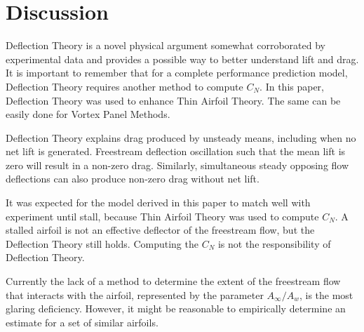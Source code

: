 \section{Discussion}

Deflection Theory is a novel physical argument somewhat corroborated by experimental data and provides a possible way to better understand lift and drag.
It is important to remember that for a complete performance prediction model, Deflection Theory requires another method to compute \(C_N\).
In this paper, Deflection Theory was used to enhance Thin Airfoil Theory.
The same can be easily done for Vortex Panel Methods.

Deflection Theory explains drag produced by unsteady means, including when no net lift is generated.
Freestream deflection oscillation such that the mean lift is zero will result in a non-zero drag.
Similarly, simultaneous steady opposing flow deflections can also produce non-zero drag without net lift.

It was expected for the model derived in this paper to match well with experiment until stall, because Thin Airfoil Theory was used to compute \(C_N\).
A stalled airfoil is not an effective deflector of the freestream flow, but the Deflection Theory still holds.
Computing the \(C_N\) is not the responsibility of Deflection Theory.

Currently the lack of a method to determine the extent of the freestream flow that interacts with the airfoil, represented by the parameter \(A_\infty / A_w\), is the most glaring deficiency.
However, it might be reasonable to empirically determine an estimate for a set of similar airfoils.


